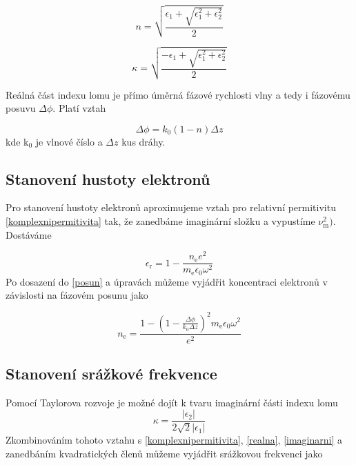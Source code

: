 \documentclass[a4paper,12pt]{article}
\begin{document}
\begin{equation}
	n = \sqrt{\frac{\epsilon_1 + \sqrt{\epsilon_1^2 + \epsilon_2^2}}{2}}
	\label{realna}
\end{equation}

\begin{equation}
	\kappa = \sqrt{\frac{-\epsilon_1 + \sqrt{\epsilon_1^2 + \epsilon_2^2}}{2}}
	\label{imaginarni}
\end{equation}

Reálná část indexu lomu je
přímo úměrná fázové rychlosti vlny a tedy i fázovému posuvu $\Delta\phi$. Platí vztah

\begin{equation}
 	\Delta\phi = k_0(1-n) \Delta z
 	\label{posun}
\end{equation}
kde k$_0$ je vlnové číslo a $\Delta z$ kus dráhy.  

\subsection{Stanovení hustoty elektronů}
Pro stanovení hustoty elektronů aproximujeme vztah pro relativní permitivitu 
\eqref{komplexnipermitivita} tak, že zanedbáme imaginární složku a vypustíme 
$\nu_\text{m}^2)$. Dostáváme

\begin{equation}
	\epsilon_\text{r} = 1- \frac{n_\text{e} e^2}{m_\text{e} \epsilon_0 \omega^2}
	\label{permitivita}
\end{equation}
Po dosazení do \eqref{posun} a úpravách můžeme vyjádřit koncentraci elektronů
v závislosti na fázovém posunu jako

\begin{equation}
	n_\text{e} = \frac{1-\left(1- \frac{\Delta\phi}{k_0 \Delta z} \right)^2
	m_\text{e} \epsilon_0 \omega^2}{e^2}
\end{equation}

\subsection{Stanovení srážkové frekvence}
Pomocí Taylorova rozvoje je možné dojít k tvaru imaginární části indexu lomu
\begin{equation}
	\kappa = \frac{|\epsilon_2|}{2\sqrt{2}|\epsilon_1|}
\end{equation}
Zkombinováním tohoto vztahu s \eqref{komplexnipermitivita}, \eqref{realna}, \eqref{imaginarni} a zanedbáním kvadratických členů můžeme vyjádřit srážkovou frekvenci jako
\end{document}
